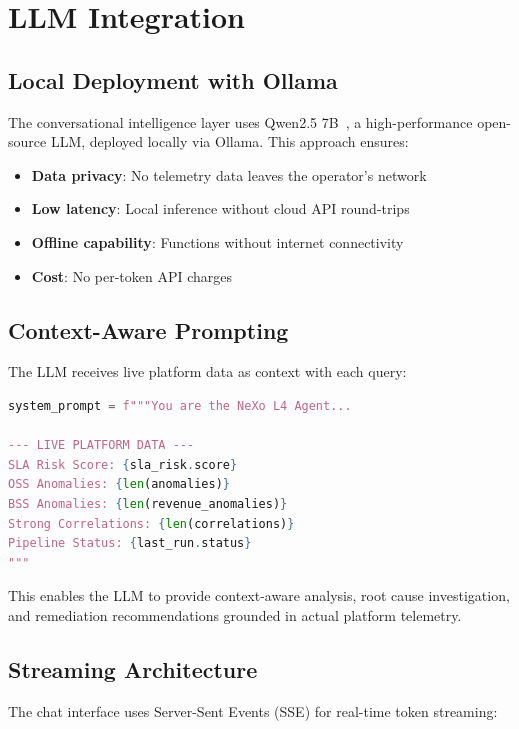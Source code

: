 \section{LLM Integration}

\subsection{Local Deployment with Ollama}

The conversational intelligence layer uses Qwen2.5 7B~\cite{qwen2024}, a high-performance open-source LLM, deployed locally via Ollama. This approach ensures:

\begin{itemize}
    \item \textbf{Data privacy}: No telemetry data leaves the operator's network
    \item \textbf{Low latency}: Local inference without cloud API round-trips
    \item \textbf{Offline capability}: Functions without internet connectivity
    \item \textbf{Cost}: No per-token API charges
\end{itemize}

\subsection{Context-Aware Prompting}

The LLM receives live platform data as context with each query:

\begin{lstlisting}[language=Python, caption={LLM context injection}]
system_prompt = f"""You are the NeXo L4 Agent...

--- LIVE PLATFORM DATA ---
SLA Risk Score: {sla_risk.score}
OSS Anomalies: {len(anomalies)}
BSS Anomalies: {len(revenue_anomalies)}
Strong Correlations: {len(correlations)}
Pipeline Status: {last_run.status}
"""
\end{lstlisting}

This enables the LLM to provide context-aware analysis, root cause investigation, and remediation recommendations grounded in actual platform telemetry.

\subsection{Streaming Architecture}

The chat interface uses Server-Sent Events (SSE) for real-time token streaming:

